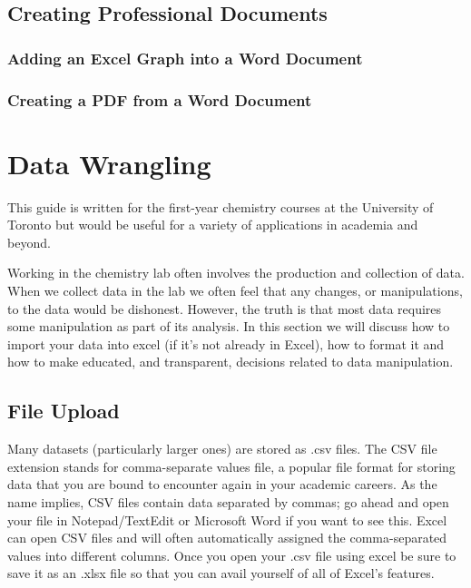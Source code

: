 \documentclass[
]{book}
\begin{document}
\hypertarget{creating-professional-documents}{%
\section{Creating Professional Documents}\label{creating-professional-documents}}

\hypertarget{adding-an-excel-graph-into-a-word-document}{%
\subsection{Adding an Excel Graph into a Word Document}\label{adding-an-excel-graph-into-a-word-document}}

\hypertarget{creating-a-pdf-from-a-word-document}{%
\subsection{Creating a PDF from a Word Document}\label{creating-a-pdf-from-a-word-document}}

\hypertarget{data-wrangling}{%
\chapter{Data Wrangling}\label{data-wrangling}}

This guide is written for the first-year chemistry courses at the University of Toronto but would be useful for a variety of applications in academia and beyond.

Working in the chemistry lab often involves the production and collection of data. When we collect data in the lab we often feel that any changes, or manipulations, to the data would be dishonest. However, the truth is that most data requires some manipulation as part of its analysis. In this section we will discuss how to import your data into excel (if it's not already in Excel), how to format it and how to make educated, and transparent, decisions related to data manipulation.

\hypertarget{file-upload}{%
\section{File Upload}\label{file-upload}}

Many datasets (particularly larger ones) are stored as .csv files. The CSV file extension stands for comma-separate values file, a popular file format for storing data that you are bound to encounter again in your academic careers. As the name implies, CSV files contain data separated by commas; go ahead and open your file in Notepad/TextEdit or Microsoft Word if you want to see this. Excel can open CSV files and will often automatically assigned the comma-separated values into different columns. Once you open your .csv file using excel be sure to save it as an .xlsx file so that you can avail yourself of all of Excel's features.
\end{document}
